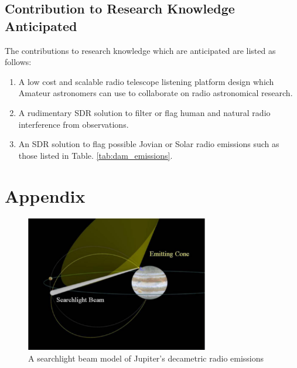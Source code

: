 \documentclass[runningheads,a4paper]{llncs}
\begin{document}
%
%
\newpage
\section*{Contribution to Research Knowledge Anticipated}

The contributions to research knowledge which are anticipated are listed as follows:

\begin{enumerate}
  \item A low cost and scalable radio telescope listening platform design which Amateur astronomers can use to collaborate on radio astronomical research.
  \item A rudimentary \gls{SDR} solution to filter or flag human and natural radio interference from observations.
  \item An \gls{SDR} solution to flag possible Jovian or Solar radio emissions such as those listed in Table. \ref{tab:dam_emissions}.
\end{enumerate} 


%
\appendix
\chapter*{Appendix}

%
\begin{figure}[here]
\centering
\includegraphics[width=8cm]{images/12}
\caption{A searchlight beam model of Jupiter's decametric radio emissions \citep{imai-08}}
\label{fig:decametric_emissions_searchlight}
\end{figure}
%
\end{document}
